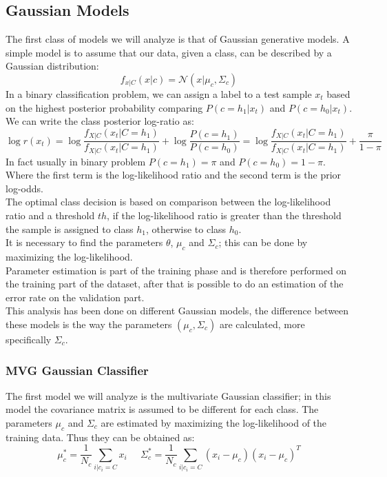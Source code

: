 \documentclass{article}
\begin{document}
\subsection{Gaussian Models}
The first class of models we will analyze is that of Gaussian generative models. A simple model is to assume that our data, given a class, can be described by a Gaussian distribution:
\begin{equation}
    f_{x|C}(x|c) = \mathcal{N}(x|\mu_c,\Sigma_c)
\end{equation}
In a binary classification problem, we can assign a label to a test sample \(x_t\) based on the highest posterior probability comparing \(P(c=h_1|x_t)\) and  \(P(c=h_0|x_t)\). We can write the class posterior log-ratio as:
\begin{equation}
    \log{r(x_t)} = \log \frac{f_{X|C}(x_t|C=h_1)}{f_{X|C}(x_t|C=h_1)} + \log{\frac{P(c=h_1)}{P(c=h_0)}}= \log \frac{f_{X|C}(x_t|C=h_1)}{f_{X|C}(x_t|C=h_1)} + \frac{\pi }{1-\pi }
\end{equation}
In fact usually in binary problem \(P(c=h_1)=\pi\) and \(P(c=h_0)=1-\pi\).\\
Where the first term is the log-likelihood ratio and the second term is the prior log-odds.\\
The optimal class decision is based on comparison between the log-likelihood ratio and a threshold \(th\), if the log-likelihood ratio is greater than the threshold the sample is assigned to class \(h_1\), otherwise to class \(h_0\).\\

It is necessary to find the parameters \(\theta \), \(\mu_c\) and \(\Sigma_c \); this can be done by maximizing the log-likelihood.\\ Parameter estimation is part of the training phase and is therefore performed on the training part of the dataset, after that is possible to do an estimation of the error rate on the validation part.\\
This analysis has been done on different Gaussian models, the difference between these models is the way the parameters \((\mu_c ,\Sigma_c )\) are calculated, more specifically \(\Sigma_c\).
\subsubsection{MVG Gaussian Classifier}
The first model we will analyze is the multivariate Gaussian classifier; in this model the covariance matrix is assumed to be different for each class. The parameters \(\mu_c\) and \(\Sigma_c\) are estimated by maximizing the log-likelihood of the training data. Thus they can be obtained as:
\begin{equation}
    \mu_c^* = \frac{1}{N_c} \sum_{i|c_i=C} x_{i} \;\;\;\;\; \Sigma_c^* = \frac{1}{N_c} \sum_{i|c_i=C} (x_{i} - \mu_c)(x_{i} - \mu_c)^T
\end{equation}
\end{document}

